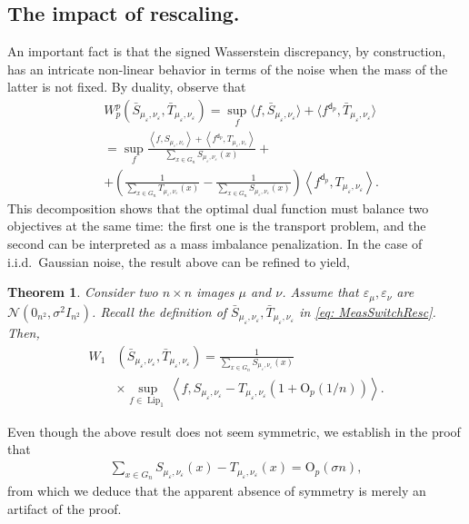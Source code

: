 \documentclass{article}
\theoremstyle{plain}
\newtheorem{thm}{Theorem}[section]
\theoremstyle{definition}
\theoremstyle{remark}
\providecommand{\Oh}{\mathrm{O}}
\begin{document}
\subsection{The impact of rescaling.}\label{subsec: Generalization to non-additive noise}
An important fact is that the signed Wasserstein discrepancy, by construction, has an intricate non-linear behavior in terms of the noise when the mass of the latter is not fixed.
By duality, observe that 
\begin{align}
    &W_p^p ( \bar S_{\mu_\varepsilon,\nu_\varepsilon} , \bar T_{\mu_\varepsilon,\nu_\varepsilon})
    = 
    \sup_{f} \langle f, \bar S_{\mu_\varepsilon,\nu_\varepsilon}  \rangle + \langle f^{\mathsf{d}_p}, \bar T_{\mu_\varepsilon,\nu_\varepsilon}  \rangle \nonumber
    \\
    &=
    \sup_{f} \frac{\left\langle f, S_{\mu_\varepsilon,\nu_\varepsilon}  \right\rangle + \left\langle f^{\mathsf{d}_p}, T_{\mu_\varepsilon,\nu_\varepsilon}\right \rangle}{\sum_{x \in G_n} S_{\mu_\varepsilon,\nu_\varepsilon}(x)} +
    \\
    &+\left(  \tfrac1{\sum_{x \in G_n} T_{\mu_\varepsilon,\nu_\varepsilon}(x)} -\tfrac1{\sum_{x \in G_n} S_{\mu_\varepsilon,\nu_\varepsilon}(x)} \right) \left\langle f^{\mathsf{d}_p},  T_{\mu_\varepsilon,\nu_\varepsilon}\right\rangle. \nonumber
\end{align}
This decomposition shows that the optimal dual function must balance two objectives at the same time: the first one is the transport problem, and the second can be interpreted as a mass imbalance penalization. 
In the case of i.i.d.\ Gaussian noise, the result above can be refined to yield,
\begin{thm}
\label{thm: noiseImpact}
Consider two $n \times n$ images $\mu$ and $\nu$.
  Assume that $\varepsilon_\mu,\varepsilon_\nu$ are $\mathcal{N}(0_{n^2}, \sigma^2I_{n^2})$. Recall the definition of $\bar S_{\mu_\varepsilon, \nu_\varepsilon}, \bar T_{\mu_\varepsilon, \nu_\varepsilon}$ in \eqref{eq: MeasSwitchResc}. Then, 
\begin{align}
    W_1
    &(
        \bar S_{\mu_\varepsilon,\nu_\varepsilon},
        \bar T_{\mu_\varepsilon, \nu_\varepsilon}
    )
    =
    \frac{1}{\sum_{x\in G_n} S_{\mu_\varepsilon, \nu_\varepsilon}(x)}
    \\
    &\times \sup_{f \in \operatorname{Lip}_1} \left\langle f, S_{\mu_\varepsilon, \nu_\varepsilon} - T_{\mu_\varepsilon, \nu_\varepsilon} \left(1 + \Oh_p\left(1/n \right)\right) \right\rangle. \nonumber
\end{align}
\end{thm}
Even though the above result does not seem symmetric,  we establish in the proof that 
\begin{align}
    \sum_{x \in G_n} S_{\mu_\varepsilon,\nu_\varepsilon}(x) - T_{\mu_\varepsilon,\nu_\varepsilon}(x) = \Oh_p( \sigma n), 
\end{align}
from which we deduce that the apparent absence of symmetry is merely an artifact of the proof. 
\end{document}
